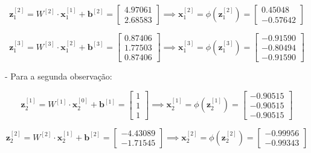 \documentclass[a4paper,12pt]{article} %
\begin{document}
\begin{enumerate}
\begin{equation*}
    \textbf{z}^{[2]}_1 = W^{[2]} \cdot \textbf{x}^{[1]}_1 + \textbf{b}^{[2]} = \begin{bmatrix} 4.97061 \\ 2.68583 \end{bmatrix} \implies \textbf{x}^{[2]}_1 = \phi(\textbf{z}^{[2]}_1)= \begin{bmatrix} 0.45048 \\ -0.57642 \end{bmatrix}
\end{equation*}

\begin{equation*}
    \textbf{z}^{[3]}_1 = W^{[3]} \cdot \textbf{x}^{[2]}_1 + \textbf{b}^{[3]} = \begin{bmatrix} 0.87406 \\ 1.77503 \\ 0.87406 \end{bmatrix} \implies \textbf{x}^{[3]}_1 = \phi(\textbf{z}^{[3]}_1)= \begin{bmatrix} -0.91590 \\ -0.80494\\ -0.91590 \end{bmatrix}
\end{equation*}

- Para a segunda observação:

\begin{equation*}
    \textbf{z}^{[1]}_2 = W^{[1]} \cdot \textbf{x}^{[0]}_2 + \textbf{b}^{[1]} = \begin{bmatrix} 1 \\ 1 \\ 1 \end{bmatrix} \implies \textbf{x}^{[1]}_2 = \phi(\textbf{z}^{[1]}_2)= \begin{bmatrix} -0.90515 \\ -0.90515 \\ -0.90515 \end{bmatrix}
\end{equation*}

\begin{equation*}
    \textbf{z}^{[2]}_2 = W^{[2]} \cdot \textbf{x}^{[1]}_2 + \textbf{b}^{[2]} = \begin{bmatrix} -4.43089 \\ -1.71545 \end{bmatrix} \implies \textbf{x}^{[2]}_2 = \phi(\textbf{z}^{[2]}_2)= \begin{bmatrix} -0.99956 \\ -0.99343 \end{bmatrix}
\end{equation*}


\end{enumerate}
\end{document}
